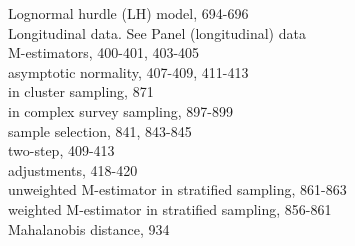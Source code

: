 \documentclass[10pt]{article}
\begin{document}
Lognormal hurdle (LH) model, 694-696\\
Longitudinal data. See Panel (longitudinal) data\\
M-estimators, 400-401, 403-405\\
asymptotic normality, 407-409, 411-413\\
in cluster sampling, 871\\
in complex survey sampling, 897-899\\
sample selection, 841, 843-845\\
two-step, 409-413\\
adjustments, 418-420\\
unweighted M-estimator in stratified sampling, 861-863\\
weighted M-estimator in stratified sampling, 856-861\\
Mahalanobis distance, 934
\end{document}
